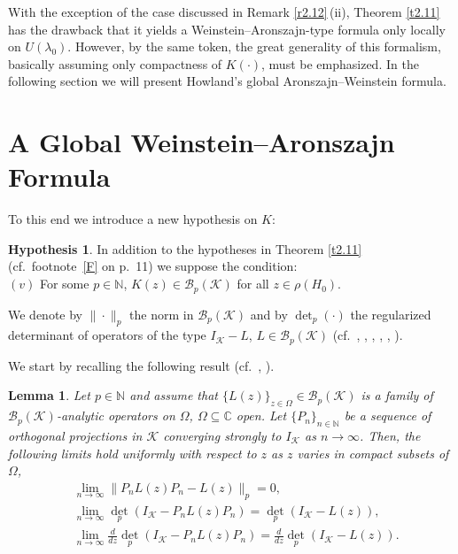 \documentclass[reqno,10pt, centertags]{amsart}
\newcommand{\bbN}{{\mathbb{N}}}
\newcommand{\bbC}{{\mathbb{C}}}
\newcommand{\cB}{{\mathcal B}}
\newcommand{\cK}{{\mathcal K}}
\newcommand{\lb}{\label}
\newcommand{\f}{\frac}
\numberwithin{equation}{section}
\newtheorem{lemma}[theorem]{Lemma}
\theoremstyle{definition}
\newtheorem{hypothesis}[theorem]{Hypothesis}
\begin{document}
With the exception of the case discussed in Remark \ref{r2.12}\,(ii),
Theorem \ref{t2.11} has the drawback that it yields a
Weinstein--Aronszajn-type formula only locally on $U(\lambda_0)$.
However, by the same token, the great generality of this formalism,
basically assuming only compactness of $K(\cdot)$, must be
emphasized. In the following section we will present Howland's
global Aronszajn--Weinstein formula.


\section{A Global Weinstein--Aronszajn Formula} \lb{s5}

To this end we introduce a new hypothesis on $K$:

\begin{hypothesis} \lb{h2.13}
In addition to the hypotheses in Theorem \ref{t2.11} (cf.\ footnote~\ref{F} on p.~11)  
we suppose the condition:  \\
$(v)$ For some $p\in\bbN$, $K(z)\in\cB_p(\cK)$ for all
$z\in\rho(H_0)$.
\end{hypothesis}

We denote by $\|\cdot\|_p$ the norm in $\cB_p(\cK)$ and by
${\det}_p(\cdot)$ the regularized determinant of operators of the
type $I_{\cK}-L$, $L\in\cB_p(\cK)$ (cf.\ \cite{GGK96}, \cite{GGK97},
\cite[Chs.\ IX--XI]{GGK00}, \cite[Sect.\ 4.2]{GK69}, \cite{Si77},
\cite[Ch.\ 9]{Si79}).

We start by recalling the following result (cf.\ \cite[p.\
162--163]{GK69}, \cite[p.\ 107]{Si79}).

\begin{lemma} \lb{l2.14}
Let $p\in\bbN$ and assume that $\{L(z)\}_{z\in\Omega}\in\cB_p(\cK)$ is a
family of
$\cB_p(\cK)$-analytic operators on $\Omega$, $\Omega\subseteq\bbC$
open. Let $\{P_n\}_{n\in\bbN}$ be a sequence of orthogonal
projections in $\cK$ converging strongly to $I_{\cK}$ as
$n\to\infty$. Then, the following limits hold uniformly with respect to
$z$ as $z$ varies in compact subsets of $\Omega$,
\begin{align}
& \lim_{n\to\infty}\|P_nL(z)P_n-L(z)\|_p=0, \lb{2.77} \\
& \lim_{n\to\infty} {\det}_p(I_{\cK}-P_nL(z)P_n)=
{\det}_p(I_{\cK}-L(z)), \lb{2.78} \\
& \lim_{n\to\infty} \f{d}{dz}{\det}_p(I_{\cK}-P_nL(z)P_n)=
\f{d}{dz}{\det}_p(I_{\cK}-L(z)). \lb{2.79}
\end{align}
\end{lemma}
\end{document}
